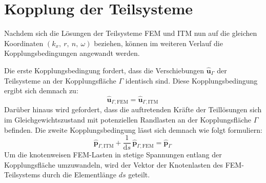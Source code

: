 \section{Kopplung der Teilsysteme}
\label{sec:Kopplung}

Nachdem sich die Lösungen der Teilsysteme FEM und ITM nun auf die gleichen Koordinaten $(k_x,\ r,\ n,\ \omega)$ beziehen, können im weiteren Verlauf die Kopplungsbedingungen angewandt werden.

Die erste Kopplungsbedingung fordert, dass die Verschiebungen $\hat{\mathbf u}_{\Gamma}$ der Teilsysteme an der Kopplungsfläche $\Gamma$ identisch sind. Diese Kopplungsbedingung ergibt sich demnach zu:
\begin{equation}\label{eq:Kopplbed_u}
	\hat{\mathbf u}_{\Gamma,\mathrm{FEM}}
	= \hat{\mathbf u}_{\Gamma,\mathrm{ITM}}\,
\end{equation}
Darüber hinaus wird gefordert, dass die auftretenden Kräfte der Teillösungen sich im Gleichgewichtszustand mit potenziellen Randlasten an der Kopplungsfläche $\Gamma$ befinden. Die zweite Kopplungsbedingung lässt sich demnach wie folgt formuliern:
\begin{equation}\label{eq:Kopplbed_p}
	\hat{\mathbf p}_{\Gamma,\mathrm{ITM}}
	+ \frac{1}{\mathrm d s}\,\hat{\mathbf p}_{\Gamma,\mathrm{FEM}}
	= \hat{\mathbf p}_{\Gamma}\,
\end{equation}
Um die knotenweisen FEM-Lasten in stetige Spannungen entlang der Kopplungsfläche umzuwandeln, wird der Vektor der Knotenlasten des FEM-Teilsystems durch die Elementlänge $ds$ geteilt.


